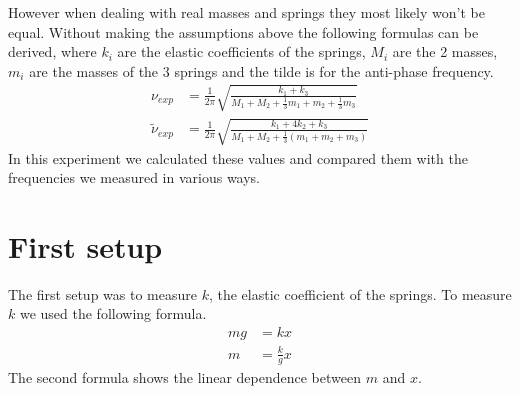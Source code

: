 \documentclass{article}
\begin{document}
However when dealing with real masses and springs they most 
likely won't be equal. Without making the assumptions above 
the following formulas can be derived, where $k_i$ are the elastic coefficients of the springs, $M_i$ are the 2 masses, $m_i$ are the masses of the 3 springs and the tilde is for the anti-phase frequency.
\begin{align}
           \nu_{exp} &= \frac{1}{2\pi}   \sqrt{\frac{k_1+k_3}
           {M_1 + M_2 + \frac{1}{3} m_1 + m_2 + \frac{1}{3}m_3 }} 
           \label{eq:nuexp}  \\
    \tilde \nu_{exp} &= \frac{1}{2\pi}   \sqrt{\frac{k_1 +4k_2 +k_3}
           {M_1 + M_2 + \frac{1}{3} (m_1 + m_2 + m_3) }} 
           \label{eq:antinuexp} 
\end{align}
In this experiment we calculated these values and compared them with the frequencies we measured in various ways. 


\section{First setup} \label{sec:setup1}

The first setup was to measure $k$, the elastic coefficient of the springs. 
To measure $k$ we used the following formula.
\begin{align}
    mg &= kx \\
    m  &= \frac{k}{g}x
\end{align}
The second formula shows the linear dependence between $m$ and $x$.
\end{document}
